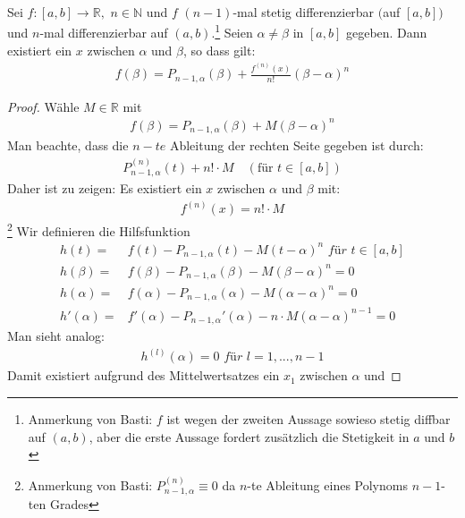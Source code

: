 \begin{Satz}{\label{satz_von_taylor}
	Sei $f: [a,b] \rightarrow \mathbb{R},$ $n \in \mathbb{N}$ und 
	$f$ $(n-1)$-mal stetig differenzierbar $($auf $[a,b])$ und 
	$n$-mal differenzierbar auf $(a,b)$.\footnote{Anmerkung von Basti: $f$ ist wegen der zweiten Aussage sowieso stetig diffbar auf $(a,b)$, aber die erste Aussage fordert zusätzlich die Stetigkeit in $a$ und $b$} Seien $\alpha \neq \beta$ 
	in $[a,b]$ gegeben. Dann existiert ein $x$ zwischen $\alpha$ 
	und $\beta$, so dass gilt: 
	\begin{align*}
		f(\beta) = P_{n-1, \alpha}(\beta) + \frac{f^{(n)}(x)}{n!}(\beta - \alpha)^n
	\end{align*}
}\end{Satz}

\begin{proof}
	Wähle $M \in \mathbb{R}$ mit 
	\begin{align*}
		f(\beta) = P_{n-1,\alpha}(\beta) + M (\beta - \alpha)^n
	\end{align*}
	Man beachte, dass die $n-te$ Ableitung der rechten Seite gegeben ist durch:
	\begin{align*}
		P_{n-1, \alpha}^{(n)}(t) + n! \cdot M \quad (\text{für } t \in [a,b])
	\end{align*}
	Daher ist zu zeigen: Es existiert ein $x$ zwischen $\alpha$ und $\beta$ mit:
	\begin{align*}
		f^{(n)}(x) = n! \cdot M
	\end{align*}\footnote{Anmerkung von Basti: $P_{n-1, \alpha}^{(n)} \equiv 0$ da $n$-te Ableitung eines Polynoms $n-1$-ten Grades}
	Wir definieren die Hilfsfunktion 
	\begin{align*}
		h(t) = & f(t) - P_{n-1, \alpha}(t) - M(t - \alpha)^n 
		\textit{ für } t \in [a,b] \\
		h(\beta) = & f(\beta) - P_{n-1, \alpha}(\beta) - M(\beta- \alpha)^n = 0 \\
		h(\alpha) = & f(\alpha) - P_{n-1, \alpha}(\alpha) -
		M(\alpha -\alpha)^n = 0 
		\tag{siehe obige Bemerekung} \\
		h'(\alpha) = & f'(\alpha) - P_{n-1, \alpha}'(\alpha) - 
		n \cdot M(\alpha - \alpha)^{n-1} = 0
	\end{align*} 
	Man sieht analog:
	\begin{align*}
		h^{(l)}(\alpha) = 0 \textit{ für } l = 1, ..., n-1
	\end{align*}
	Damit existiert aufgrund des Mittelwertsatzes ein $x_1$ zwischen $\alpha$ und 

\end{proof}
